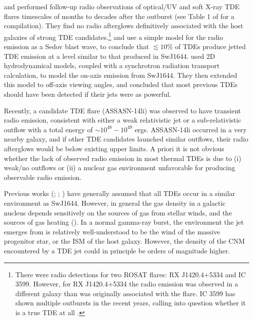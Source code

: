 \documentclass[usenatbib,fleqn]{mnras}
\begin{document}
\citet{Bower+2013} and \citet{van-Velzen+2013} performed follow-up
radio observations of optical/UV and soft X-ray TDE flares timescales
of months to decades after the outburst (see Table 1 of
\citealt{Mimica+2015} for a compilation). They find no radio afterglows
definitively associated with the host galaxies of strong TDE
candidates.\footnote{There were radio detections for two ROSAT flares:
  RX J1420.4+5334 and IC 3599. However, for RX J1420.4+5334 the radio
  emission was observed in a different galaxy than was originally
  associated with the flare.  IC 3599 has shown multiple outbursts in
  the recent years, calling into question whether it is a true TDE at all
  \citep{Campana+2015}.}  \citet{Bower+2013} and
\citet{van-Velzen+2013} use a simple model for the radio emission as a
Sedov blast wave, to conclude that $\lesssim 10\%$ of TDEs produce
jetted TDE emission at a level similar to that produced in SwJ1644.  \citet{Mimica+2015} used 2D hydrodynamical models, coupled
with a synchrotron radiation transport calculation, to model the
on-axis emission from SwJ1644. They then extended this
model to off-axis viewing angles, and concluded that most previous
TDEs should have been detected if their jets were as powerful. 

Recently, a candidate TDE flare (ASSASN-14li) was observed to
have transient radio emission, consistent with either a weak
relativistic jet \citep{van-Velzen+2015} or a sub-relativistic outflow
\citep{Alexander+2015} with a total energy of
$\sim 10^{48}-10^{49}$ ergs.  ASSASN-14li occurred in a very nearby galaxy,
and if other TDE candidates launched similar outflows, their radio
afterglows would be below existing upper limits. A priori it
is not obvious whether the lack of observed radio emission in most
thermal TDEs is due to (i) weak/no outflows or (ii) a nuclear gas
environment unfavorable for producing observable radio emission.

Previous works (\citealt{Bower+2013}; \citealt{van-Velzen+2013};
\citealt{Mimica+2015}) have generally assumed that all TDEs occur in a
similar environment as SwJ1644.  However, in general the
gas density in a galactic nucleus depends sensitively on the sources
of gas from stellar winds, and the sources of gas heating
(\citealt{Quataert2004,Generozov+2015}).  In a normal gamma-ray burst, the
environment the jet emerges from is relatively well-understood to be
the wind of the massive progenitor star, or the ISM of the host
galaxy.  However, the density of the CNM encountered by a TDE jet
could in principle be orders of magnitude higher.
\end{document}
